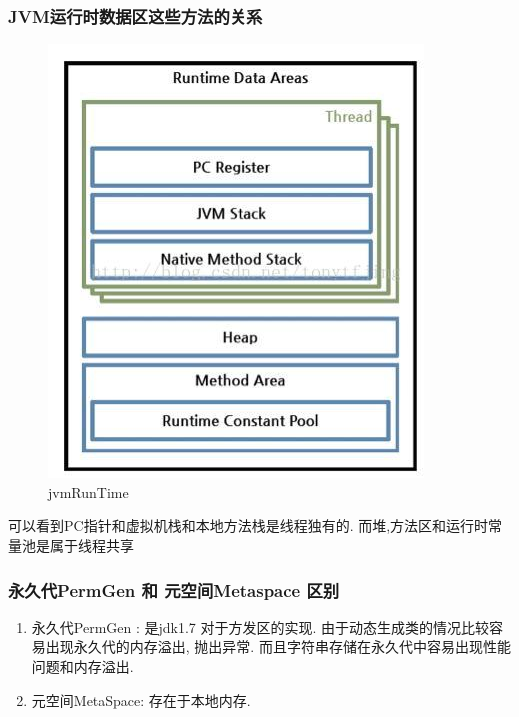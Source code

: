 \documentclass[UTF8]{ctexart}
\begin{document}
\subsubsection{JVM运行时数据区这些方法的关系}
\begin{figure}
	\centering
	\includegraphics[width=0.7\linewidth]{figures/jvmRunTime.jpg}
	\caption{jvmRunTime}
	\label{fig:jvmRunTime}
\end{figure}
可以看到PC指针和虚拟机栈和本地方法栈是线程独有的. 而堆,方法区和运行时常量池是属于线程共享
\subsubsection{永久代PermGen 和 元空间Metaspace 区别}
\begin{enumerate}
	\item 永久代PermGen : 是jdk1.7 对于方发区的实现. 由于动态生成类的情况比较容易出现永久代的内存溢出, 抛出异常. 而且字符串存储在永久代中容易出现性能问题和内存溢出.
	\item 元空间MetaSpace: 存在于本地内存.
\end{enumerate}
\end{document}
